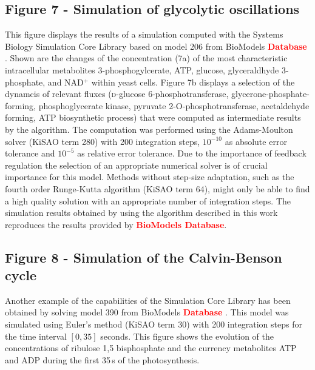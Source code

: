 \documentclass[10pt]{bmc_article}
\newenvironment{bmcformat}{\baselineskip20pt\sloppy\setboolean{publ}{false}}{\baselineskip20pt\sloppy}
\newcommand{\TODO}[1]{\textcolor{red}{\textbf{#1}}}
\begin{document}
\begin{bmcformat}
\subsection*{Figure 7 - Simulation of glycolytic oscillations}
This figure displays the results of a simulation computed with the Systems
Biology Simulation Core Library based on model 206 from BioModels \TODO{Database}
\cite{Novere2006a, Wolf2000}.
Shown are the changes of the concentration (7a) of the most characteristic
intracellular metabolites 3-phosphogylcerate, ATP, glucose, glyceraldhyde 
3-phosphate, and NAD$^+$ within yeast cells.
Figure 7b displays a selection of the dynamcis of relevant fluxes 
(\textsc{d}-glucose 6-phosphotransferase, glycerone-phosphate-forming,
phosphoglycerate kinase, pyruvate 2-O-phosphotransferase, acetaldehyde forming,
ATP biosynthetic process)
that were computed as intermediate results by the algorithm.
The computation was performed using the Adams-Moulton solver \cite{Hairer2000}
(KiSAO term 280) with 200 integration steps, $10^{-10}$ as absolute error
tolerance and $10^{-5}$ as relative error tolerance.
Due to the importance of feedback regulation the selection of an appropriate
numerical solver is of crucial importance for this model.
Methods without step-size adaptation, such as the fourth order Runge-Kutta
algorithm (KiSAO term 64), might only be able to find a high quality solution 
with an appropriate number of integration steps. 
The simulation results obtained by using the algorithm described in this work
reproduces the results provided by \TODO{BioModels Database}. 

\subsection*{Figure 8 - Simulation of the Calvin-Benson cycle}
Another example of the capabilities of the Simulation Core Library has been
obtained by solving model 390 from BioModels \TODO{Database} 
\cite{Novere2006a, Arnold2011}.
This model was simulated using Euler's method (KiSAO term 30) with 200
integration steps for the time interval $[0, 35]$ seconds.
This figure shows the evolution of the concentrations of ribulose 1,5
bisphosphate and the currency metabolites ATP and ADP during the first 35\,s of
the photosynthesis.




\end{bmcformat}
\end{document}
